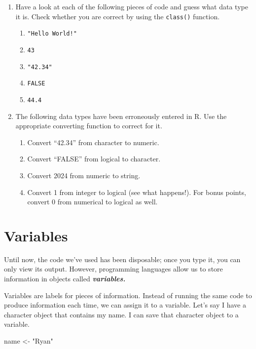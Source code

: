 \documentclass[
]{book}
\newenvironment{Shaded}{\begin{snugshade}}{\end{snugshade}}
\newcommand{\NormalTok}[1]{#1}
\newcommand{\OtherTok}[1]{\textcolor[rgb]{0.56,0.35,0.01}{#1}}
\newcommand{\StringTok}[1]{\textcolor[rgb]{0.31,0.60,0.02}{#1}}
\providecommand{\tightlist}{%
  \setlength{\itemsep}{0pt}\setlength{\parskip}{0pt}}
\begin{document}
\begin{enumerate}
\def\labelenumi{\arabic{enumi}.}
\tightlist
\item
  Have a look at each of the following pieces of code and guess what data type it is. Check whether you are correct by using the \texttt{class()} function.

  \begin{enumerate}
  \def\labelenumii{\arabic{enumii}.}
  \tightlist
  \item
    \texttt{"Hello\ World!"}
  \item
    \texttt{43}
  \item
    \texttt{"42.34"}
  \item
    \texttt{FALSE}
  \item
    \texttt{44.4}
  \end{enumerate}
\item
  The following data types have been erroneously entered in R. Use the appropriate converting function to correct for it.

  \begin{enumerate}
  \def\labelenumii{\arabic{enumii}.}
  \tightlist
  \item
    Convert ``42.34'' from character to numeric.
  \item
    Convert ``FALSE'' from logical to character.
  \item
    Convert 2024 from numeric to string.
  \item
    Convert 1 from integer to logical (see what happens!). For bonus points, convert 0 from numerical to logical as well.
  \end{enumerate}
\end{enumerate}

\hypertarget{variables}{%
\section{Variables}\label{variables}}

Until now, the code we've used has been disposable; once you type it, you can only view its output. However, programming languages allow us to store information in objects called \textbf{\emph{variables.}}

Variables are labels for pieces of information. Instead of running the same code to produce information each time, we can assign it to a variable. Let's say I have a character object that contains my name. I can save that character object to a variable.

\begin{Shaded}
\begin{Highlighting}[]
\NormalTok{name }\OtherTok{\textless{}{-}} \StringTok{"Ryan"}
\end{Highlighting}
\end{Shaded}
\end{document}

